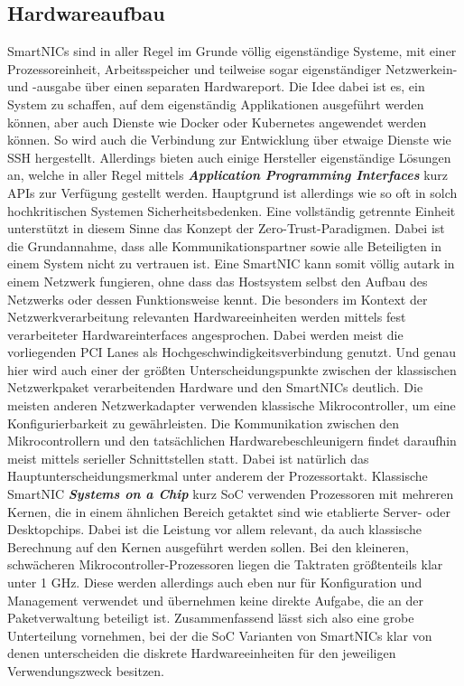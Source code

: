 \subsection{Hardwareaufbau}
SmartNICs sind in aller Regel im Grunde völlig eigenständige Systeme, mit einer Prozessoreinheit, Arbeitsspeicher und teilweise sogar eigenständiger Netzwerkein- und -ausgabe über einen separaten Hardwareport. Die Idee dabei ist es, ein System zu schaffen, auf dem eigenständig Applikationen ausgeführt werden können, aber auch Dienste wie Docker oder Kubernetes angewendet werden können. So wird auch die Verbindung zur Entwicklung über etwaige Dienste wie SSH hergestellt. Allerdings bieten auch einige Hersteller eigenständige Lösungen an, welche in aller Regel mittels \textbf{\textit{Application Programming Interfaces}} kurz APIs zur Verfügung gestellt werden. Hauptgrund ist allerdings wie so oft in solch hochkritischen Systemen Sicherheitsbedenken. Eine vollständig getrennte Einheit unterstützt in diesem Sinne das Konzept der Zero-Trust-Paradigmen. Dabei ist die Grundannahme, dass alle Kommunikationspartner sowie alle Beteiligten in einem System nicht zu vertrauen ist. Eine SmartNIC kann somit völlig autark in einem Netzwerk fungieren, ohne dass das Hostsystem selbst den Aufbau des Netzwerks oder dessen Funktionsweise kennt. Die besonders im Kontext der Netzwerkverarbeitung relevanten Hardwareeinheiten werden mittels fest verarbeiteter Hardwareinterfaces angesprochen. Dabei werden meist die vorliegenden PCI Lanes als Hochgeschwindigkeitsverbindung genutzt. Und genau hier wird auch einer der größten Unterscheidungspunkte zwischen der klassischen Netzwerkpaket verarbeitenden Hardware und den SmartNICs deutlich. Die meisten anderen Netzwerkadapter verwenden klassische Mikrocontroller, um eine Konfigurierbarkeit zu gewährleisten. Die Kommunikation zwischen den Mikrocontrollern und den tatsächlichen Hardwarebeschleunigern findet daraufhin meist mittels serieller Schnittstellen statt. Dabei ist natürlich das Hauptunterscheidungsmerkmal unter anderem der Prozessortakt. Klassische SmartNIC \textbf{\textit{Systems on a Chip}} kurz SoC verwenden Prozessoren mit mehreren Kernen, die in einem ähnlichen Bereich getaktet sind wie etablierte Server- oder Desktopchips. Dabei ist die Leistung vor allem relevant, da auch klassische Berechnung auf den Kernen ausgeführt werden sollen. Bei den kleineren, schwächeren Mikrocontroller-Prozessoren liegen die Taktraten größtenteils klar unter 1 GHz. Diese werden allerdings auch eben nur für Konfiguration und Management verwendet und übernehmen keine direkte Aufgabe, die an der Paketverwaltung beteiligt ist. Zusammenfassend lässt sich also eine grobe Unterteilung vornehmen, bei der die SoC Varianten von SmartNICs klar von denen unterscheiden die diskrete Hardwareeinheiten für den jeweiligen Verwendungszweck besitzen.

